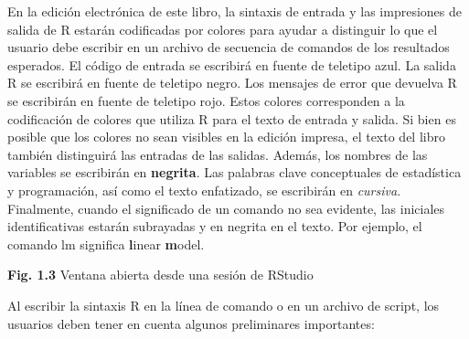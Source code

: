 \documentclass[
]{book}
\begin{document}
En la edición electrónica de este libro, la sintaxis de entrada y las impresiones de salida de R estarán codificadas por colores para ayudar a distinguir lo que el usuario debe escribir en un archivo de secuencia de comandos de los resultados esperados. El código de entrada se escribirá en fuente de teletipo azul. La salida R se escribirá en fuente de teletipo negro. Los mensajes de error que devuelva R se escribirán en fuente de teletipo rojo. Estos colores corresponden a la codificación de colores que utiliza R para el texto de entrada y salida. Si bien es posible que los colores no sean visibles en la edición impresa, el texto del libro también distinguirá las entradas de las salidas. Además, los nombres de las variables se escribirán en \textbf{negrita}. Las palabras clave conceptuales de estadística y programación, así como el texto enfatizado, se escribirán en \emph{cursiva}. Finalmente, cuando el significado de un comando no sea evidente, las iniciales identificativas estarán subrayadas y en negrita en el texto. Por ejemplo, el comando lm significa \textbf{l}inear \textbf{m}odel.

\textbf{Fig. 1.3} Ventana abierta desde una sesión de RStudio

Al escribir la sintaxis R en la línea de comando o en un archivo de script, los usuarios deben tener en cuenta algunos preliminares importantes:
\end{document}
